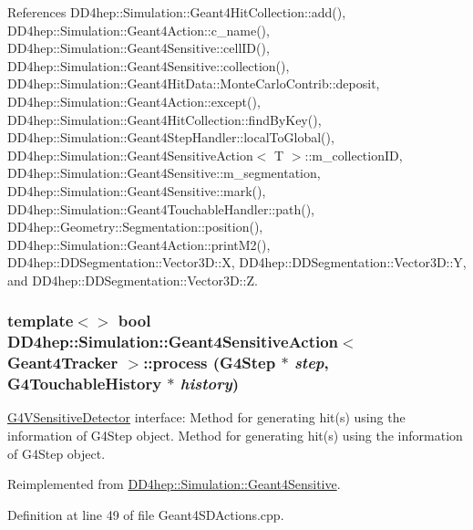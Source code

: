 References DD4hep::Simulation::Geant4HitCollection::add(), DD4hep::Simulation::Geant4Action::c\_\-name(), DD4hep::Simulation::Geant4Sensitive::cellID(), DD4hep::Simulation::Geant4Sensitive::collection(), DD4hep::Simulation::Geant4HitData::MonteCarloContrib::deposit, DD4hep::Simulation::Geant4Action::except(), DD4hep::Simulation::Geant4HitCollection::findByKey(), DD4hep::Simulation::Geant4StepHandler::localToGlobal(), DD4hep::Simulation::Geant4SensitiveAction$<$ T $>$::m\_\-collectionID, DD4hep::Simulation::Geant4Sensitive::m\_\-segmentation, DD4hep::Simulation::Geant4Sensitive::mark(), DD4hep::Simulation::Geant4TouchableHandler::path(), DD4hep::Geometry::Segmentation::position(), DD4hep::Simulation::Geant4Action::printM2(), DD4hep::DDSegmentation::Vector3D::X, DD4hep::DDSegmentation::Vector3D::Y, and DD4hep::DDSegmentation::Vector3D::Z.\hypertarget{class_d_d4hep_1_1_simulation_1_1_geant4_sensitive_action_a126f9c3d065be1608935c5e16149cec3}{
\subsubsection[{process}]{\setlength{\rightskip}{0pt plus 5cm}template$<$$>$ bool {\bf DD4hep::Simulation::Geant4SensitiveAction}$<$ {\bf Geant4Tracker} $>$::process (G4Step $\ast$ {\em step}, \/  G4TouchableHistory $\ast$ {\em history})}}
\label{class_d_d4hep_1_1_simulation_1_1_geant4_sensitive_action_a126f9c3d065be1608935c5e16149cec3}


\hyperlink{class_g4_v_sensitive_detector}{G4VSensitiveDetector} interface: Method for generating hit(s) using the information of G4Step object. Method for generating hit(s) using the information of G4Step object. 

Reimplemented from \hyperlink{class_d_d4hep_1_1_simulation_1_1_geant4_sensitive_a9a9463a6c29a66dad43a52ffc9f7838d}{DD4hep::Simulation::Geant4Sensitive}.

Definition at line 49 of file Geant4SDActions.cpp.

